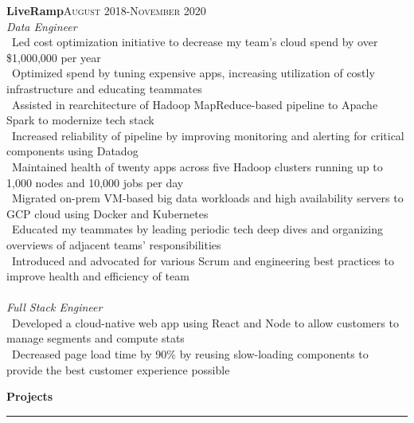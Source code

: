 \documentclass[a4paper,10pt]{article}
\newcommand{\horizontalline}{{\rule{533pt}{0.625pt}\\}}
\renewcommand{\section}[1]{{\noindent\textbf{\large #1}\\\horizontalline}}
\renewcommand{\subsection}[2]{{\noindent \textbf{#1}\hfill \textsc{#2}\\}}
\begin{document}
\subsection{LiveRamp}{August 2018-November 2020}
\textit{Data Engineer}\\
\textbullet\ Led cost optimization initiative to decrease my team's cloud spend by over \$1,000,000 per year\\
\textbullet\ Optimized spend by tuning expensive apps, increasing utilization of costly infrastructure and educating teammates\\
\textbullet\ Assisted in rearchitecture of Hadoop MapReduce-based pipeline to Apache Spark to modernize tech stack\\
\textbullet\ Increased reliability of pipeline by improving monitoring and alerting for critical components using Datadog\\
\textbullet\ Maintained health of twenty apps across five Hadoop clusters running up to 1,000 nodes and 10,000 jobs per day\\
\textbullet\ Migrated on-prem VM-based big data workloads and high availability servers to GCP cloud using Docker and Kubernetes\\
\textbullet\ Educated my teammates by leading periodic tech deep dives and organizing overviews of adjacent teams' responsibilities\\
\textbullet\ Introduced and advocated for various Scrum and engineering best practices to improve health and efficiency of team\\ \\
\textit{Full Stack Engineer}\\
\textbullet\ Developed a cloud-native web app using React and Node to allow customers to manage segments and compute stats\\
\textbullet\ Decreased page load time by 90\% by reusing slow-loading components to provide the best customer experience possible\\

\section{Projects}
\end{document}
